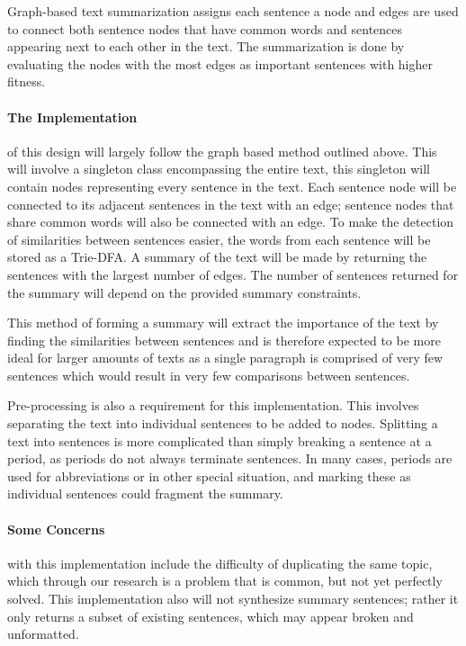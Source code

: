 \documentclass{article}
\begin{document}
	Graph-based text summarization assigns each sentence a node and edges are used to connect both sentence nodes that have common words and sentences appearing next to each other in the text. The summarization is done by evaluating the nodes with the most edges as important sentences with higher fitness. \cite{art4}
	
	\paragraph{The Implementation} of this design will largely follow the graph based method outlined above. This will involve a singleton class encompassing the entire text, this singleton will contain nodes representing every sentence in the text. Each sentence node will be connected to its adjacent sentences in the text with an edge; sentence nodes that share common words will also be connected with an edge. To make the detection of similarities between sentences easier, the words from each sentence will be stored as a Trie-DFA. A summary of the text will be made by returning the sentences with the largest number of edges. The number of sentences returned for the summary will depend on the provided summary constraints. 
	
	This method of forming a summary will extract the importance of the text by finding the similarities between sentences and is therefore expected to be more ideal for larger amounts of texts as a single paragraph is comprised of very few sentences which would result in very few comparisons between sentences. 
	
	Pre-processing is also a requirement for this implementation. This involves separating the text into individual sentences to be added to nodes. Splitting a text into sentences is more complicated than simply breaking a sentence at a period, as periods do not always terminate sentences. In many cases, periods are used for abbreviations or in other special situation, and marking these as individual sentences could fragment the summary.
	
	\paragraph{Some Concerns} with this implementation include the difficulty of duplicating the same topic, which through our research is a problem that is common, but not yet perfectly solved. This implementation also will not synthesize summary sentences; rather it only returns a subset of existing sentences, which may appear broken and unformatted.
	
	
	\printbibliography
\end{document}
